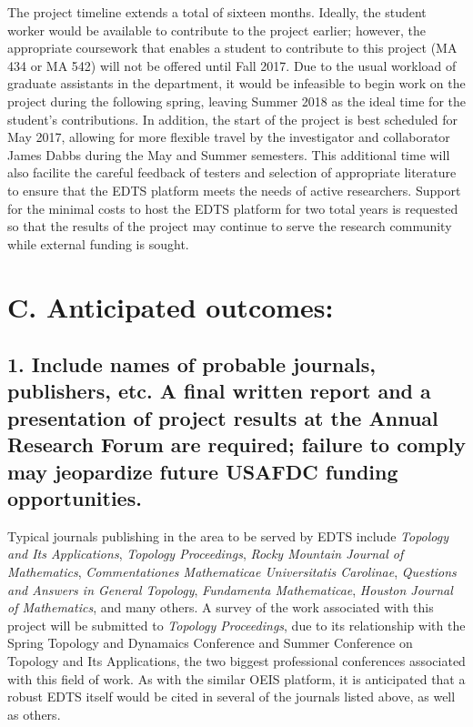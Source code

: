 \documentclass[10pt]{article}
\begin{document}
The project timeline extends a total of sixteen months. Ideally, the student
worker would be available to contribute to the project earlier; however,
the appropriate coursework that enables a student to contribute to this project
(MA 434 or MA 542) will not be offered until Fall 2017. Due to the usual
workload of graduate assistants in the department, it would be infeasible to
begin work on the project during the following spring, leaving Summer 2018
as the ideal time for the student's contributions. In addition, the start of
the project is best scheduled for May 2017, allowing for more flexible travel
by the investigator and collaborator James Dabbs during the May and Summer
semesters. This additional time will also facilite the careful feedback of
testers and selection of appropriate literature to ensure that the EDTS
platform meets the needs of active researchers. Support for the minimal
costs to host the EDTS platform for two total years is requested so that
the results of the project may continue to serve the research community
while external funding is sought.










\section*{C. Anticipated outcomes:}

\subsection*{1. Include names of probable journals, publishers, etc.  A final written report and a presentation of project results at the Annual Research Forum are required; failure to comply may jeopardize future USAFDC funding opportunities.}

Typical journals publishing in the area to be served by EDTS include
  \textit{Topology and Its Applications},
  \textit{Topology Proceedings},
  \textit{Rocky Mountain Journal of Mathematics},
  \textit{Commentationes Mathematicae Universitatis Carolinae},
  \textit{Questions and Answers in General Topology},
  \textit{Fundamenta Mathematicae},
  \textit{Houston Journal of Mathematics}, and many others.
  A survey of the work associated with this project will be submitted
  to \textit{Topology Proceedings}, due to its relationship with the Spring
  Topology and Dynamaics Conference and Summer Conference on Topology and
  Its Applications, the two biggest professional conferences associated
  with this field of work. As with the similar OEIS platform, it is anticipated
  that a robust EDTS itself would be cited in several of the journals listed
  above, as well as others.
\end{document}
